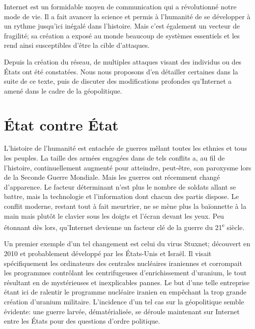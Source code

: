 \documentclass[article, french]{yReport}
\begin{document}
	Internet est un formidable moyen de communication qui a révolutionné notre mode de vie.
	Il a fait avancer la science et permis à l'humanité de se développer à un rythme jusqu'ici inégalé dans l'histoire.
	Mais c'est également un vecteur de fragilité; sa création a exposé au monde beaucoup de systèmes essentiels et les rend ainsi susceptibles d'être la cible d'attaques.
	
	Depuis la création du réseau, de multiples attaques visant des individus ou des États ont été constatées.
	Nous nous proposons d'en détailler certaines dans la suite de ce texte, puis de discuter des modifications profondes qu'Internet a amené dans le cadre de la géopolitique.
	
	\section{État contre État}
	L'histoire de l'humanité est entachée de guerres mêlant toutes les ethnies et tous les peuples.
	La taille des armées engagées dans de tels conflits a, au fil de l'histoire, continuellement augmenté pour atteindre, peut-être, son paroxysme lors de la Seconde Guerre Mondiale.
	Mais les guerres ont récemment changé d'apparence.
	Le facteur déterminant n'est plus le nombre de soldats allant se battre, mais la technologie et l'information dont chacun des partis dispose.
	Le conflit moderne, restant tout à fait meurtrier, ne se mène plus la baïonnette à la main mais plutôt le clavier sous les doigts et l'écran devant les yeux.	Peu étonnant dès lors, qu'Internet devienne un facteur clé de la guerre du 21\textsuperscript{e} siècle.
	
	Un premier exemple d'un tel changement est celui du virus Stuxnet; découvert en 2010 et probablement développé par les États-Unis et Israël.
	Il visait spécifiquement les ordinateurs des centrales nucléaires iraniennes et corrompait les programmes contrôlant les centrifugeuses d'enrichissement d'uranium, le tout résultant en de mystérieuses et inexplicables pannes.
	Le but d'une telle entreprise étant ici de ralentir le programme nucléaire iranien en empêchant la trop grande création d'uranium militaire.
	L'incidence d'un tel cas sur la géopolitique semble évidente: une guerre larvée, dématérialisée, se déroule maintenant sur Internet entre les États pour des questions d'ordre politique.
	
\end{document}

